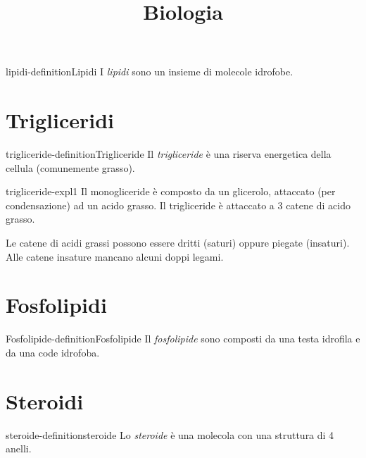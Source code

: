 \documentclass[preview]{standalone}
\begin{document}
\title{Biologia}
\genpage

\begin{snippetdefinition}{lipidi-definition}{Lipidi}
    I \textit{lipidi} sono un insieme di molecole idrofobe.
\end{snippetdefinition}



\section{Trigliceridi}

\begin{snippetdefinition}{trigliceride-definition}{Trigliceride}
    Il \textit{trigliceride} è una riserva energetica della cellula (comunemente grasso).
\end{snippetdefinition}

\begin{snippet}{trigliceride-expl1}
    Il monogliceride è composto da un glicerolo, attaccato (per condensazione) ad un acido grasso.
    Il trigliceride è attaccato a 3 catene di acido grasso.

    Le catene di acidi grassi possono essere dritti (saturi) oppure piegate (insaturi).
    Alle catene insature mancano alcuni doppi legami.
\end{snippet}

\section{Fosfolipidi}

\begin{snippetdefinition}{Fosfolipide-definition}{Fosfolipide}
    Il \textit{fosfolipide} sono composti da una testa idrofila e da una code idrofoba.
\end{snippetdefinition}


\section{Steroidi}

\begin{snippetdefinition}{steroide-definition}{steroide}
    Lo \textit{steroide} è una molecola con una struttura di 4 anelli.
\end{snippetdefinition}

\end{document}
